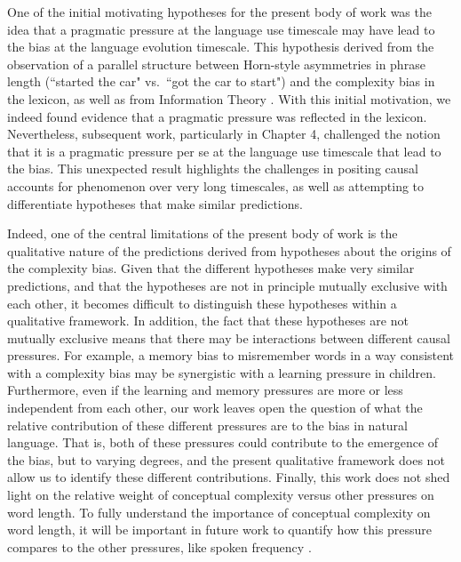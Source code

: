One of the initial motivating hypotheses for the present body of work was the idea that a pragmatic pressure at the language use timescale  may have lead to the bias at the language evolution timescale. This hypothesis derived from the observation of a parallel structure between Horn-style asymmetries in phrase length (``started the car" vs.\ ``got the car to start") and the complexity bias in the lexicon, as well as from Information Theory \cite{horn1984,shannon1948}. With this initial motivation, we indeed found evidence that a pragmatic pressure was reflected in the lexicon. Nevertheless, subsequent work, particularly in Chapter 4, challenged the notion that it is a pragmatic pressure  per se at the language use timescale that lead to the bias. This unexpected result highlights the challenges in positing causal accounts for phenomenon over very long timescales, as well as attempting to differentiate hypotheses that make  similar predictions.

Indeed, one of the central limitations of the present body of work is the qualitative nature of the predictions derived from  hypotheses about the origins of the complexity bias. Given that the different hypotheses make very similar predictions, and that the hypotheses are not in principle mutually exclusive with each other, it becomes difficult to distinguish these hypotheses within a qualitative framework. In addition, the fact that these hypotheses are not mutually exclusive means that there may be interactions between different causal pressures. For example, a memory bias to misremember words in a way consistent with a complexity bias may be synergistic with a learning pressure in children. Furthermore, even if the learning and memory pressures are more or less independent from each other, our work leaves open the question of what the relative contribution of these different pressures are to the bias in natural language. That is, both of these pressures could contribute to the emergence of the bias, but to varying degrees, and the present qualitative framework does not allow us to identify these different contributions. Finally, this work does not shed light on the relative weight of conceptual complexity versus other pressures on word length. To fully understand the importance of conceptual complexity on word length, it will be important in future work to quantify how this pressure compares to the other pressures, like spoken frequency \cite{zipf1936}.

